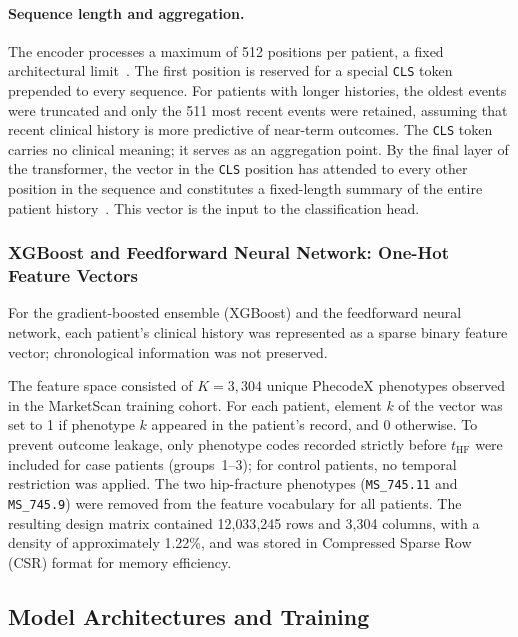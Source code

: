 \documentclass[12pt]{article}
\begin{document}
\paragraph{Sequence length and aggregation.}
The encoder processes a maximum of 512 positions per patient, a fixed architectural limit~\citep{Devlin2019BERT}. The first position is reserved for a special \texttt{CLS} token prepended to every sequence. For patients with longer histories, the oldest events were truncated and only the 511 most recent events were retained, assuming that recent clinical history is more predictive of near-term outcomes. The \texttt{CLS} token carries no clinical meaning; it serves as an aggregation point. By the final layer of the transformer, the vector in the \texttt{CLS} position has attended to every other position in the sequence and constitutes a fixed-length summary of the entire patient history~\citep{Devlin2019BERT}. This vector is the input to the classification head.

\subsubsection{XGBoost and Feedforward Neural Network: One-Hot Feature Vectors}

For the gradient-boosted ensemble (XGBoost) and the feedforward neural network, each patient's clinical history was represented as a sparse binary feature vector; chronological information was not preserved.

The feature space consisted of $K = 3{,}304$ unique PhecodeX phenotypes observed in the MarketScan training cohort. For each patient, element $k$ of the vector was set to 1 if phenotype $k$ appeared in the patient's record, and 0 otherwise. To prevent outcome leakage, only phenotype codes recorded strictly before $t_{\mathrm{HF}}$ were included for case patients (groups~1--3); for control patients, no temporal restriction was applied. The two hip-fracture phenotypes (\texttt{MS\_745.11} and \texttt{MS\_745.9}) were removed from the feature vocabulary for all patients. The resulting design matrix contained 12{,}033{,}245 rows and 3{,}304 columns, with a density of approximately 1.22\%, and was stored in Compressed Sparse Row (CSR) format for memory efficiency.

\subsection{Model Architectures and Training}
\end{document}
